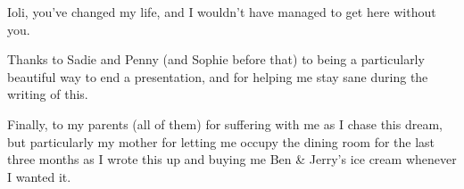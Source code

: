 \documentclass[twoside,symmetric,nobib]{./arm-thesis}
\begin{document}
\begin{fullwidth}
Ioli, you've changed my life, and I wouldn't have managed to get here without you.

Thanks to Sadie and Penny (and Sophie before that) to being a particularly beautiful way to end a presentation, and for helping me stay sane during the writing of this.

Finally, to my parents (all of them) for suffering with me as I chase this dream, but particularly my mother for letting me occupy the dining room for the last three months as I wrote this up and buying me Ben \& Jerry's ice cream whenever I wanted it.
\end{fullwidth}

\tableofcontents



\end{document}
